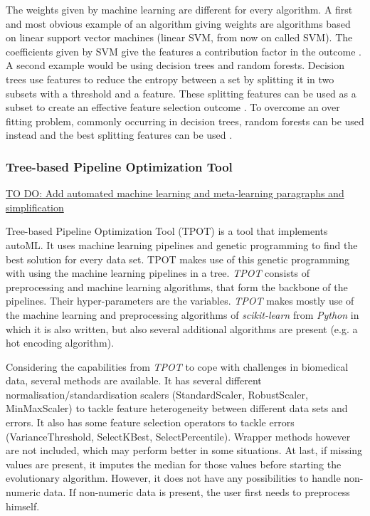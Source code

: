 \documentclass[10pt,a4paper]{report}
\begin{document}
	The weights given by machine learning are different for every algorithm. A first and most obvious example of an algorithm giving weights are algorithms based on linear support vector machines (linear SVM, from now on called SVM). The coefficients given by SVM give the features a contribution factor in the outcome \cite{jong2004feature, prados2004mining, zhang2006recursive, guyon2002gene}. A second example would be using decision trees and random forests. Decision trees use features to reduce the entropy between a set by splitting it in two subsets with a threshold and a feature. These splitting features can be used as a subset to create an effective feature selection outcome \cite{geurts2005proteomic, wu2003comparison, Duch2006}. To overcome an over fitting problem, commonly occurring in decision trees, random forests can be used instead and the best splitting features can be used \cite{liaw2002classification}.
	
	
	\subsubsection{Tree-based Pipeline Optimization Tool} \underline{TO DO: Add automated machine learning and meta-learning paragraphs and simplification}
	\label{FSsubsec:TPOT}
	
	Tree-based Pipeline Optimization Tool (TPOT) is a tool that implements autoML. It uses machine learning pipelines and genetic programming to find the best solution for every data set. TPOT makes use of this genetic programming with using the machine learning pipelines in a tree. \textit{TPOT} consists of preprocessing and machine learning algorithms, that form the backbone of the pipelines. Their hyper-parameters are the variables. \textit{TPOT} makes mostly use of the machine learning and preprocessing algorithms of \textit{scikit-learn} from \textit{Python} in which it is also written, but also several additional algorithms are present (e.g. a hot encoding algorithm).
	
	Considering the capabilities from \textit{TPOT} to cope with challenges in biomedical data, several methods are available. It has several different normalisation/standardisation scalers (StandardScaler, RobustScaler, MinMaxScaler) to tackle feature heterogeneity between different data sets and errors. It also has some feature selection operators to tackle errors (VarianceThreshold, SelectKBest, SelectPercentile). Wrapper methods however are not included, which may perform better in some situations. At last, if missing values are present, it imputes the median for those values before starting the evolutionary algorithm. However, it does not have any possibilities to handle non-numeric data. If non-numeric data is present, the user first needs to preprocess himself.
	
\end{document}

